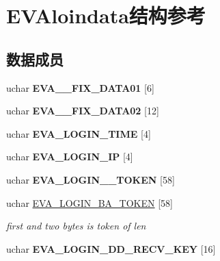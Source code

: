 \hypertarget{struct_e_v_aloindata}{\section{\-E\-V\-Aloindata结构参考}
\label{struct_e_v_aloindata}
}
\subsection*{数据成员}
\begin{DoxyCompactItemize}
\item 
\hypertarget{struct_e_v_aloindata_abd7dd581bf361f4a59a9fee13c2215b7}{uchar {\bfseries \-E\-V\-A\-\_\-\_\-\-F\-I\-X\-\_\-\-D\-A\-T\-A01} \mbox{[}6\mbox{]}}\label{struct_e_v_aloindata_abd7dd581bf361f4a59a9fee13c2215b7}

\item 
\hypertarget{struct_e_v_aloindata_aad0322a3b943b98ac241f512a771c483}{uchar {\bfseries \-E\-V\-A\-\_\-\_\-\-F\-I\-X\-\_\-\-D\-A\-T\-A02} \mbox{[}12\mbox{]}}\label{struct_e_v_aloindata_aad0322a3b943b98ac241f512a771c483}

\item 
\hypertarget{struct_e_v_aloindata_a5a0ebfd85e0a096811215a1cbb857e1b}{uchar {\bfseries \-E\-V\-A\-\_\-\-L\-O\-G\-I\-N\-\_\-\-T\-I\-M\-E} \mbox{[}4\mbox{]}}\label{struct_e_v_aloindata_a5a0ebfd85e0a096811215a1cbb857e1b}

\item 
\hypertarget{struct_e_v_aloindata_aa313a0b3a6ea91e0d65a34c144f79987}{uchar {\bfseries \-E\-V\-A\-\_\-\-L\-O\-G\-I\-N\-\_\-\-I\-P} \mbox{[}4\mbox{]}}\label{struct_e_v_aloindata_aa313a0b3a6ea91e0d65a34c144f79987}

\item 
\hypertarget{struct_e_v_aloindata_aabfb1bd4e43a48a95134dbf4ca8d789a}{uchar {\bfseries \-E\-V\-A\-\_\-\-L\-O\-G\-I\-N\-\_\-\_\-\-T\-O\-K\-E\-N} \mbox{[}58\mbox{]}}\label{struct_e_v_aloindata_aabfb1bd4e43a48a95134dbf4ca8d789a}

\item 
\hypertarget{struct_e_v_aloindata_aa243105162cf0c0b4b6c503c36820b8d}{uchar \hyperlink{struct_e_v_aloindata_aa243105162cf0c0b4b6c503c36820b8d}{\-E\-V\-A\-\_\-\-L\-O\-G\-I\-N\-\_\-\-B\-A\-\_\-\-T\-O\-K\-E\-N} \mbox{[}58\mbox{]}}\label{struct_e_v_aloindata_aa243105162cf0c0b4b6c503c36820b8d}

\begin{DoxyCompactList}\small\item\em first and two bytes is token of len \end{DoxyCompactList}\item 
\hypertarget{struct_e_v_aloindata_afac1350c1142a519930bd05b5f436774}{uchar {\bfseries \-E\-V\-A\-\_\-\-L\-O\-G\-I\-N\-\_\-\-D\-D\-\_\-\-R\-E\-C\-V\-\_\-\-K\-E\-Y} \mbox{[}16\mbox{]}}\label{struct_e_v_aloindata_afac1350c1142a519930bd05b5f436774}


\end{DoxyCompactItemize}
